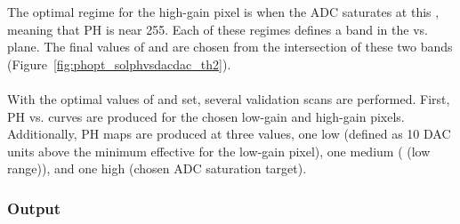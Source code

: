 The optimal regime for the high-gain pixel is when the ADC saturates at this \vcal, meaning that PH is near 255.
Each of these regimes defines a band in the \phoffset vs. \phscale plane.
The final values of \phscale and \phoffset are chosen from the intersection of these two bands (Figure~\ref{fig:phopt_solphvsdacdac_th2}).
\\\\
With the optimal values of \phscale and \phoffset set, several validation scans are performed.
First, PH vs. \vcal curves are produced for the chosen low-gain and high-gain pixels.
Additionally, PH maps are produced at three \vcal values, 
one low (defined as 10 DAC units above the minimum effective \vcal for the low-gain pixel),
one medium ( (low range)),
and one high (chosen ADC saturation target).

\subsubsection{Output}


